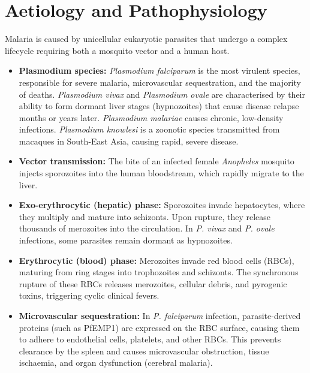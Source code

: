 \section*{Aetiology and Pathophysiology}
Malaria is caused by unicellular eukaryotic parasites that undergo a complex lifecycle requiring both a mosquito vector and a human host.
\begin{itemize}
    \item \textbf{Plasmodium species:} \textit{Plasmodium falciparum} is the most virulent species, responsible for severe malaria, microvascular sequestration, and the majority of deaths. \textit{Plasmodium vivax} and \textit{Plasmodium ovale} are characterised by their ability to form dormant liver stages (hypnozoites) that cause disease relapse months or years later. \textit{Plasmodium malariae} causes chronic, low-density infections. \textit{Plasmodium knowlesi} is a zoonotic species transmitted from macaques in South-East Asia, causing rapid, severe disease.
    \item \textbf{Vector transmission:} The bite of an infected female \textit{Anopheles} mosquito injects sporozoites into the human bloodstream, which rapidly migrate to the liver.
    \item \textbf{Exo-erythrocytic (hepatic) phase:} Sporozoites invade hepatocytes, where they multiply and mature into schizonts. Upon rupture, they release thousands of merozoites into the circulation. In \textit{P. vivax} and \textit{P. ovale} infections, some parasites remain dormant as hypnozoites.
    \item \textbf{Erythrocytic (blood) phase:} Merozoites invade red blood cells (RBCs), maturing from ring stages into trophozoites and schizonts. The synchronous rupture of these RBCs releases merozoites, cellular debris, and pyrogenic toxins, triggering cyclic clinical fevers.
    \item \textbf{Microvascular sequestration:} In \textit{P. falciparum} infection, parasite-derived proteins (such as PfEMP1) are expressed on the RBC surface, causing them to adhere to endothelial cells, platelets, and other RBCs. This prevents clearance by the spleen and causes microvascular obstruction, tissue ischaemia, and organ dysfunction (cerebral malaria).
\end{itemize}

